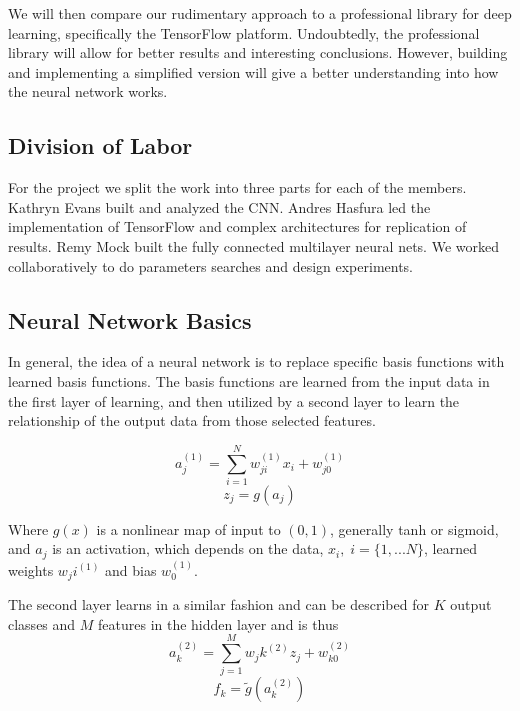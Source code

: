 \documentclass[12pt, twocolumn]{article}
\begin{document}
 We will then compare our rudimentary approach to a professional library for deep learning, specifically the TensorFlow platform. Undoubtedly, the professional library will allow for better results and interesting conclusions. However, building and implementing a simplified version will give a better understanding into how the neural network works. 

\subsection{Division of Labor}
	
 
 For the project we split the work into three parts for each of the members. Kathryn Evans built and analyzed the CNN. Andres Hasfura led the implementation of TensorFlow and complex architectures for replication of results. Remy Mock built the fully connected multilayer neural nets. We worked collaboratively to do parameters searches and design experiments. 

\subsection{Neural Network Basics}

In general, the idea of a neural network is to replace specific basis functions with learned basis functions. The basis functions are learned from the input data in the first layer of learning, and then utilized by a second layer to learn the relationship of the output data from those selected features.

\begin{equation}
a_j^{(1)}= \sum_{i=1}^N w_{ji}^{(1)} x_i+w_{j0}^{(1)}
\end{equation}
\begin{equation}
z_j= g(a_j)
\end{equation}

Where $g(x)$ is a nonlinear map of input to $(0,1)$, generally tanh or sigmoid, and $a_j$ is an activation, which depends on the data, $x_i, \; i=\{1,...N\}$, learned weights $w_ji^{(1)}$ and bias $w_0^{(1)}$. 

The second layer learns in a similar fashion and can be described for $K$ output classes and $M$ features in the hidden layer and is thus 
\begin{equation}
a_k^{(2)}= \sum_{j=1}^M w_jk^{(2)} z_j+w_{k0}^{(2)}
\end{equation}
\begin{equation}
f_k= \tilde{g}(a_k^{(2)})
\end{equation}
 
\end{document}
